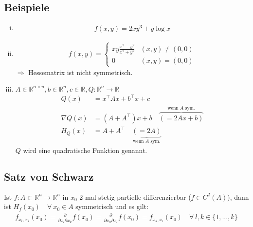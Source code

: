 \documentclass[11pt,a4paper]{book}
\newcommand {\R}	{\mathbb{R}}
\newcommand {\Rn}	{\mathbb{R}^n}
\newcommand {\Rnxn}	{\mathbb{R}^{n \times n}}
\newcommand{\1}    	{\mathbbm{1}}
\begin{document}
\subsection{Beispiele}
\begin{enumerate}[(i)]
	\item \begin{align*}
		f(x,y) = 2xy^3 + y \log x
	\end{align*}
	\item \begin{align*}
		f(x,y) = \left\{ \begin{array}{ll}
			xy \frac{x^2 - y^2}{x^2 + y^2} & (x,y) \neq (0,0) \\
			0 & (x,y) = (0,0)
		\end{array} \right.
	\end{align*}
	\(\Rightarrow\) Hessematrix ist nicht symmetrisch.
	\item \(A \in \Rnxn, b \in \Rn, c \in \R, Q : \Rn \rightarrow \R\)
	\begin{align*}
		Q(x) &= x^\top A x + b^\top x + c \\
		\nabla Q(x) &= \left( A + A^\top \right)x + b \quad \overbrace{( =  2Ax + b)}^{\textrm{wenn }A\textrm{ sym.}} \\
		H_Q(x) &= A + A^\top \quad \underbrace{( = 2A)}_{\textrm{wenn }A\textrm{ sym.}}
	\end{align*}
	\(Q\) wird eine quadratische Funktion genannt.
\end{enumerate}

\subsection{Satz von Schwarz}
Ist \(f : A \subset \Rn \rightarrow \Rn\) in \(x_0\) 2-mal stetig partielle differenzierbar (\(f \in C^2(A)\)), dann ist \(H_f(x_0) \quad \forall~ x_0 \in A\) symmetrisch und es gilt:
\begin{align*}
	f_{x_l, x_k} (x_0) = \frac{\partial}{\partial x_l \partial x_k} f(x_0) = \frac{\partial}{\partial x_k \partial x_l} f(x_0) = f_{x_k, x_l} (x_0) \quad \forall~ l,k \in \{ 1, ..., k \}
\end{align*}
\end{document}
